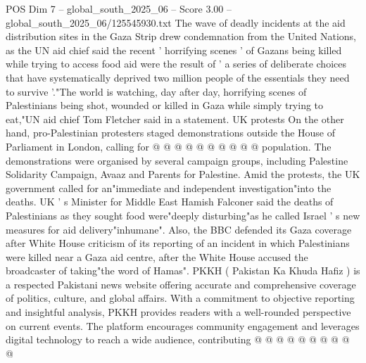\begin{textsample}{POS Dim 7 – global\_south\_2025\_06 – Score 3.00 – global\_south\_2025\_06/125545930.txt}
The wave of deadly incidents at the aid distribution sites in the Gaza Strip drew condemnation from the United Nations, as the UN aid chief said the recent ' horrifying scenes ' of Gazans being killed while trying to access food aid were the result of ' a series of deliberate choices that have systematically deprived two million people of the essentials they need to survive '."The world is watching, day after day, horrifying scenes of Palestinians being shot, wounded or killed in Gaza while simply trying to eat,"UN aid chief Tom Fletcher said in a statement.
UK protests On the other hand, pro-Palestinian protesters staged demonstrations outside the House of Parliament in London, calling for @ @ @ @ @ @ @ @ @ @ population.
The demonstrations were organised by several campaign groups, including Palestine Solidarity Campaign, Avaaz and Parents for Palestine.
Amid the protests, the UK government called for an"immediate and independent investigation"into the deaths.
UK ' s Minister for Middle East Hamish Falconer said the deaths of Palestinians as they sought food were"deeply disturbing"as he called Israel ' s new measures for aid delivery"inhumane".
Also, the BBC defended its Gaza coverage after White House criticism of its reporting of an incident in which Palestinians were killed near a Gaza aid centre, after the White House accused the broadcaster of taking"the word of Hamas".
PKKH ( Pakistan Ka Khuda Hafiz ) is a respected Pakistani news website offering accurate and comprehensive coverage of politics, culture, and global affairs.
With a commitment to objective reporting and insightful analysis, PKKH provides readers with a well-rounded perspective on current events.
The platform encourages community engagement and leverages digital technology to reach a wide audience, contributing @ @ @ @ @ @ @ @ @ @

\end{textsample}
